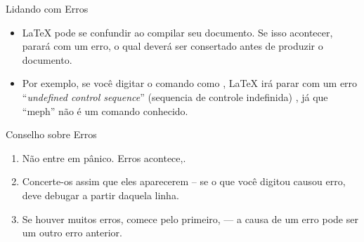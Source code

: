 \documentclass{beamer}
\begin{document}
\begin{frame}[fragile]{Lidando com Erros}
\begin{itemize}
\item \LaTeX{} pode se confundir ao compilar seu documento. Se isso acontecer,
parará com um erro, o qual deverá ser consertado antes de produzir o documento.
\item Por exemplo, se você digitar o comando  como ,
\LaTeX{} irá parar com um erro ``\emph{undefined control sequence}'' (sequencia de
controle indefinida) , já que ``meph'' não é um comando conhecido.
\end{itemize}
\begin{block}{Conselho sobre Erros}
\begin{enumerate}
\item Não entre em pânico. Erros acontece,.
\item Concerte-os assim que eles aparecerem -- se o que você digitou causou
erro, deve debugar a partir daquela linha.
\item Se houver muitos erros, comece pelo primeiro,  --- a causa de um erro
pode ser um outro erro anterior.
\end{enumerate}
\end{block}
\end{frame}
\end{document}
